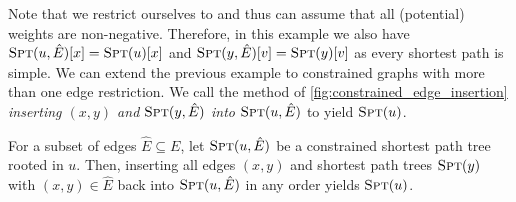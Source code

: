 Note that we restrict ourselves to \algsp and thus can assume that all (potential) weights are non-negative.
Therefore, in this example we also have $\textsc{Spt}(u, \hat{E})[x] = \textsc{Spt}(u)[x]$ and $\textsc{Spt}(y, \hat{E})[v] = \textsc{Spt}(y)[v]$ as every shortest path is simple.
We can extend the previous example to constrained graphs with more than one edge restriction.
We call the method of \cref{fig:constrained_edge_insertion} \emph{inserting $(x, y)$ and $\textsc{Spt}(y, \hat{E})$ into $\textsc{Spt}(u, \hat{E})$} to yield $\textsc{Spt}(u)$.

\begin{lemma}\label{lem:multiple_spt_insertions}
    For a subset of edges $\hat{E} \subseteq E$, let $\textsc{Spt}(u, \hat{E})$ be a constrained shortest path tree rooted in $u$.
    Then, inserting all edges $(x,y)$ and shortest path trees $\textsc{Spt}(y)$ with $(x,y) \in \hat{E}$ back into $\textsc{Spt}(u, \hat{E})$ in any order yields $\textsc{Spt}(u)$.
\end{lemma}
